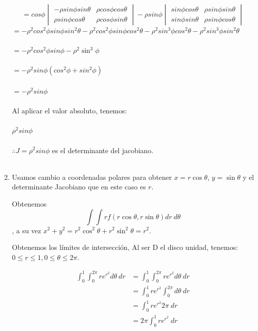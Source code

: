 \documentclass[10pt,letterpaper,fleqn]{article}
\begin{document}
\begin{enumerate}
		\[=  cos \phi 
        \begin{vmatrix}
        - \rho sin \phi sin \theta &
        \rho cos \phi cos \theta \\
        \rho sin \phi cos \theta &
        \rho cos \phi sin \theta
        \end{vmatrix} 
        - \rho sin \phi 
        \begin{vmatrix}
        sin \phi cos \theta &
        \rho sin \phi sin \theta \\
        sin \phi sin \theta &
        \rho sin \phi cos \theta
        \end{vmatrix}
        \]
      	$= - \rho^2 cos^2 \phi sin \phi sin^2 \theta - \rho^2 cos^2 \phi sin \phi cos^2 \theta - \rho^2 sin^3 \phi cos^2 \theta - \rho^2 sin^3 \phi sin^2 \theta$\\\\
      	$= - \rho^2 cos^2 \phi sin \phi - \rho^2 \sin^3 \phi$\\\\
      	$= - \rho^2 sin \phi (cos^2 \phi + sin^2 \phi)$\\\\
      	$= - \rho^2 sin \phi$\\\\
      	Al aplicar el valor absoluto, tenemos:\\\\
      	$\rho^2 sin \phi$\\\\
      	$\therefore J = \rho^2 sin \phi$  es el determinante del jacobiano.\\\\
        
        \item Usamos cambio a coordenadas polares para obtener 
        	  $x = r\cos\theta$, $y = \sin\theta$ y el determinante 
        	  Jacobiano que en este caso es $r$.

        	  Obtenemos $$\int\int rf(r\cos\theta, r\sin\theta)dr\ d\theta$$,
        	  a su vez $x^2 + y^2 = r^2\cos^2\theta + r^2\sin^2\theta = r^2$.

        	  Obtenemos los límites de intersección,
        	  Al ser D el disco unidad, tenemos: $0 \leq r\leq 1, 0 \leq \theta\leq 2\pi$.

        	  \begin{equation*}
        	  \begin{split}
        	  	\int_0^1\int_0^{2\pi} re^{r^2} d\theta\ dr 
        	  	&= \int_0^1\int_0^{2\pi} re^{r^2} d\theta\ dr \\
        	  	&= \int_0^1 re^{r^2} \int_0^{2\pi}  d\theta\ dr \\
        	  	&= \int_0^1 re^{r^2} 2\pi\ dr \\
        	  	&= 2\pi \int_0^1 re^{r^2}\ dr \\
        	  \end{split}
        	  \end{equation*}


\end{enumerate}
\end{document}
